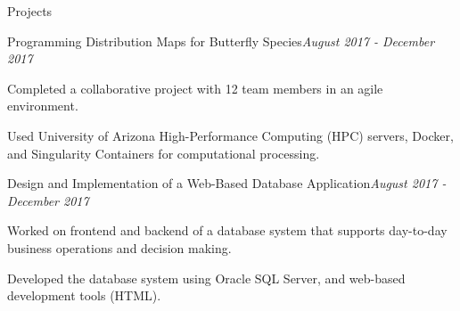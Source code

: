 \documentclass{resume} %
\begin{document}
\begin{rSection}{Projects}

\begin{rSubsection}{Programming Distribution Maps for Butterfly Species}{\em August 2017 - December 2017}{}{}%
\item Completed a collaborative project with 12 team members in an agile environment.
\item Used University of Arizona High-Performance Computing (HPC) servers, Docker, and Singularity Containers for computational processing. 
\end{rSubsection}



\begin{rSubsection}{Design and Implementation of a Web-Based Database Application}{\em August 2017 - December 2017}{}{}%
\item Worked on frontend and backend of a database system that supports day-to-day business operations and decision making.
\item Developed the database system using Oracle SQL Server, and web-based development tools (HTML).
\end{rSubsection}


\end{rSection}


\end{document}
